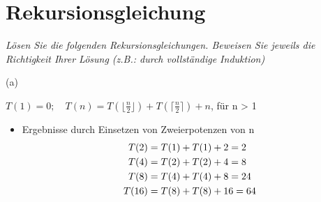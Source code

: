 										
\newcommand{\dozent}{Wolfgang Mulzer, Katharina Klost}					%
\newcommand{\tutor}{Tobias Gleißner}						%
\newcommand{\tutoriumNo}{02}				%
\newcommand{\ubungNo}{01}									%
\newcommand{\veranstaltung}{Algorithmen, Datenstrukturen und Datenabstraktion}	%
\newcommand{\semester}{Semester}						%
\newcommand{\studenten}{Nicolas Benjamin, Michael Wernitz}			%
\newcommand{\aufgNo}{3}	

\usepackage{amsmath}
\usepackage{mathtools}
\usepackage{letltxmacro}

							


\section{ Rekursionsgleichung \hfill}
{\itshape Lösen Sie die folgenden Rekursionsgleichungen. Beweisen Sie jeweils die Richtigkeit Ihrer Lösung (z.B.: durch vollständige Induktion)}

\begin{flushleft}
	(a)
\end{flushleft} 

\begin{center}
$T(1) = 0; \quad T(n) = T\left(\lfloor{\frac{n}{2}}\rfloor\right) + T\left(\lceil{\frac{n}{2}}\rceil\right) + n$, für n > 1 
\end{center}



\begin{itemize}
\item  Ergebnisse durch Einsetzen von Zweierpotenzen von n\\
	\begin{equation}
		\begin{aligned}
		 	T(2) &= T(1) + T(1) + 2 = 2 \\
   			T(4) &= T(2) + T(2) + 4 = 8 \\
   			T(8) &= T(4) + T(4) + 8 = 24 \notag \\
   			T(16)&= T(8) + T(8) + 16 = 64 \\		
		\end{aligned}
	\end{equation}
	
\end{itemize}
 
